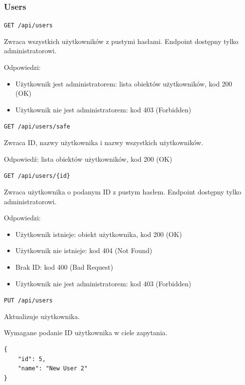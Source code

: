 \documentclass[a4paper,twoside,12pt]{book}
\begin{document}
\subsubsection{Users}\label{users}

\label{get-all-users}

\texttt{GET\ /api/users}

Zwraca wszystkich użytkowników z pustymi hasłami. Endpoint dostępny tylko administratorowi.

Odpowiedzi: 
\begin{itemize}
	\item Użytkownik jest administratorem: lista obiektów użytkowników, kod 200 (OK) 
	\item Użytkownik nie jest administratorem: kod 403 (Forbidden)
\end{itemize}

\label{get-all-users-safe}

\texttt{GET\ /api/users/safe}

Zwraca ID, nazwy użytkownika i nazwy wszystkich użytkowników.

Odpowiedź: lista obiektów użytkowników, kod 200 (OK)

\label{get-user-by-id}

\texttt{GET\ /api/users/\{id\}}

Zwraca użytkownika o podanym ID z pustym hasłem. Endpoint dostępny tylko administratorowi.

Odpowiedzi: 
\begin{itemize}
	\item Użytkownik istnieje: obiekt użytkownika, kod 200 (OK)
	\item Użytkownik nie istnieje: kod 404 (Not Found) 
	\item Brak ID: kod 400 (Bad Request) 
	\item Użytkownik nie jest administratorem: kod 403 (Forbidden)
\end{itemize}

\label{update-user}

\texttt{PUT\ /api/users}

Aktualizuje użytkownika.

Wymagane podanie ID użytkownika w ciele zapytania.

\begin{verbatim}
{
    "id": 5,
    "name": "New User 2"
}
\end{verbatim}
\end{document}
